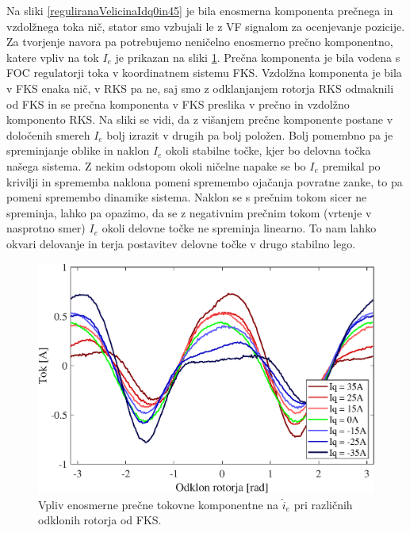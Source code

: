 \documentclass[a4paper,twoside,openright,12pt,slovene]{book}
\begin{document}
Na sliki \ref{reguliranaVelicinaIdq0in45} je bila enosmerna komponenta prečnega in vzdolžnega toka nič, stator smo vzbujali le z VF signalom za ocenjevanje pozicije. Za tvorjenje navora pa potrebujemo
neničelno enosmerno prečno komponentno, katere vpliv na tok $I_e$ je prikazan na sliki \ref{reguliranaVelicinaIs}. Prečna komponenta je bila vodena s FOC regulatorji toka v koordinatnem sistemu FKS.
Vzdolžna komponenta je bila v FKS enaka nič, v RKS pa ne, saj smo z odklanjanjem rotorja RKS odmaknili od FKS in se prečna komponenta v FKS preslika v prečno in vzdolžno komponento RKS. Na sliki se
vidi, da z višanjem prečne komponente postane v določenih smereh $I_e$ bolj izrazit v drugih pa bolj položen. Bolj pomembno pa je spreminjanje oblike in naklon $I_e$ okoli stabilne točke, kjer bo delovna točka našega
sistema. Z nekim odstopom okoli ničelne napake se bo $I_e$ premikal po krivilji in sprememba naklona pomeni spremembo ojačanja povratne zanke, to pa pomeni spremembo dinamike sistema. Naklon se s
prečnim tokom sicer ne spreminja, lahko pa opazimo, da se z negativnim prečnim tokom (vrtenje v nasprotno smer) $I_e$ okoli delovne točke ne spreminja linearno. To nam lahko okvari delovanje in terja
postavitev delovne točke v drugo stabilno lego.


\begin{figure}[!htbp]
    \centering
    \includegraphics[width=1\columnwidth]{Slike/reguliranaVelicinaIs.eps}
    \caption{\label{reguliranaVelicinaIs} Vpliv enosmerne prečne tokovne komponentne na $\hat{i}_{e}$ pri različnih odklonih rotorja od FKS.}
\end{figure}
\end{document}
